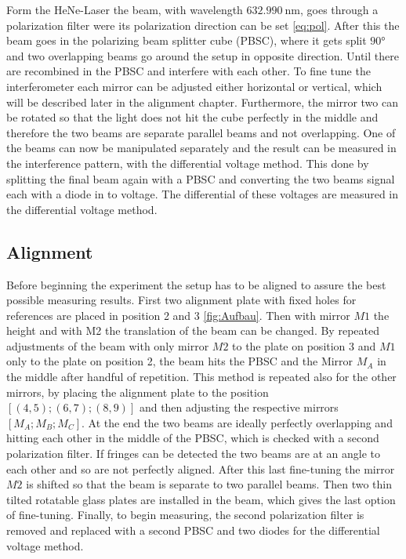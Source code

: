 Form the HeNe-Laser the beam, with wavelength $\qty{632.990}{\nano\meter}$, goes through a polarization filter were its polarization direction can be set \eqref{eq:pol}.
After this the beam goes in the polarizing beam splitter cube (PBSC), 
where it gets split $90°$ and two overlapping beams go around the setup in opposite direction. 
Until there are recombined in the PBSC and interfere with each other. 
To fine tune the interferometer each mirror can be adjusted either horizontal or vertical, which will be described later in the alignment chapter.
Furthermore, the mirror two can be rotated so that the light does not hit the cube perfectly in the middle 
and therefore the two beams are separate parallel beams and not overlapping. 
One of the beams can now be manipulated separately and the result can be measured in the interference pattern, with the differential voltage method. 
This done by splitting the final beam again with a PBSC and converting the two beams signal each with a diode in to voltage. 
The differential of these voltages are measured in the differential voltage method.

\subsection{Alignment}
Before beginning the experiment the setup has to be aligned to assure the best possible measuring results.  
First two alignment plate with fixed holes for references are placed in position 2 and 3 \eqref{fig:Aufbau}. 
Then with mirror $M1$ the height and with M2 the translation of the beam can be changed.
By repeated adjustments of the beam with only mirror $M2$ to the plate on position 3 and $M1$ only to the plate on position 2, 
the beam hits the PBSC and the Mirror $M_A$ in the middle after handful of repetition. 
This method is repeated also for the other mirrors, by placing the alignment plate to the position $[(4,5);(6,7);(8,9)]$ 
and then adjusting the respective mirrors $[M_A;M_B;M_C]$. 
At the end the two beams are ideally perfectly overlapping and hitting each other in the middle of the PBSC, 
which is checked with a second polarization filter. 
If fringes can be detected the two beams are at an angle to each other and so are not perfectly aligned.
After this last fine-tuning the mirror $M2$ is shifted so that the beam is separate to two parallel beams. 
Then two thin tilted rotatable glass plates are installed in the beam, which gives the last option of fine-tuning.
Finally, to begin measuring, the second polarization filter is removed and replaced with a second PBSC and two diodes for the differential voltage method.

